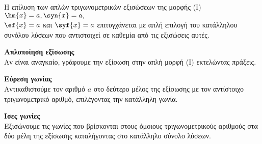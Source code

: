 \newpage
\noindent
\Lymena
\begin{Methodos}{1cm}\label{meth:tr_eksiswsh}
Η επίλυση των απλών τριγωνομετρικών εξισώσεων της μορφής (Ι) $ \hm{x}=a, \syn{x}=a,$\\ $ \ef{x}=a $ και $ \syf{x}=a $ επιτυγχάνεται με απλή επιλογή του κατάλληλου συνόλου λύσεων που αντιστοιχεί σε καθεμία από τις εξισώσεις αυτές.
\begin{bhma}
\item \textbf{Απλοποίηση εξίσωσης}\\
Αν είναι αναγκαίο, γράφουμε την εξίσωση στην απλή μορφή (Ι) εκτελώντας πράξεις.
\item \textbf{Εύρεση γωνίας}\\
Αντικαθιστούμε τον αριθμό $ a $ στο δεύτερο μέλος της εξίσωσης με τον αντίστοιχο τριγωνομετρικό αριθμό, επιλέγοντας την κατάλληλη γωνία.
\item \textbf{Ίσες γωνίες}\\
Εξισώνουμε τις γωνίες που βρίσκονται στους όμοιους τριγωνομετρικούς αριθμούς στα δύο μέλη της εξίσωσης καταλήγοντας στο κατάλληλο σύνολο λύσεων.
\end{bhma}
\end{Methodos}
\lysh
